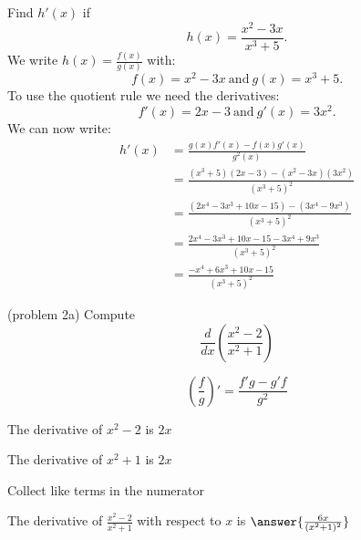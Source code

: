 \documentclass[handout]{ximera}
\begin{document}
\begin{example}[example 2]
Find $h'(x)$ if 
\[
h(x) = \frac{x^2 - 3x}{x^3 +5}.
\]
We write $\displaystyle{h(x) = \frac{f(x)}{g(x)}}$ 
with:
\[f(x) =x^2 - 3x \ \text{and} \  g(x)= x^3 + 5.\]
 To use the quotient rule we need the derivatives:
\[f'(x) = 2x-3 \ \text{and} \  g'(x) = 3x^2.\]
We can now write: 
\begin{align*}
h'(x) &= \frac{g(x)f'(x) - f(x)g'(x)}{g^2(x)}\\
&= \frac{(x^3 + 5)(2x-3) - (x^2-3x)(3x^2)}{(x^3 + 5)^2}\\
&= \frac{(2x^4 -3x^3 + 10x - 15) -(3x^4-9x^3)}{(x^3 + 5)^2}\\
&= \frac{2x^4 -3x^3 + 10x - 15 -3x^4+9x^3}{(x^3 + 5)^2}\\
&= \frac{-x^4 +6x^3 + 10x - 15}{(x^3 + 5)^2}
\end{align*}
\end{example}


\begin{center}
\begin{foldable}
\end{foldable}
\end{center}


\begin{problem}(problem 2a)
  Compute
  \[
  \frac{d}{dx} \left(\frac{x^2 - 2}{x^2 + 1}\right)
  \]
  
    \begin{hint}
      \[\left(\frac{f}{g}\right)' = \frac{f'g-g'f}{g^2}\]
    \end{hint}
    \begin{hint}
      The derivative of $x^2 - 2$ is $2x$
    \end{hint}
    \begin{hint}
      The derivative of $x^2 + 1$ is $2x$
    \end{hint}
    \begin{hint}
      Collect like terms in the numerator
    \end{hint}
		The derivative of $\frac{x^2 - 2}{x^2 + 1}$ with respect to $x$ is
		 $\answer{\frac{6x}{(x^2 + 1)^2}}$
		
\end{problem}
\end{document}
